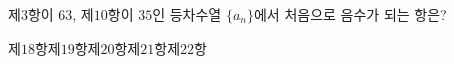 제$3$항이 $63$, 제$10$항이 $35$인 등차수열 $\{a_n\}$에서 처음으로 음수가 되는 항은?
\begin{choices32}{제$18$항}{제$19$항}{제$20$항}{제$21$항}{제$22$항}\end{choices32}
